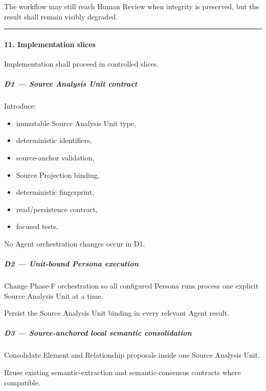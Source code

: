 The workflow may still reach Human Review when integrity is preserved, but the result shall remain visibly degraded.

\begin{center}\rule{0.5\linewidth}{0.5pt}\end{center}

\hypertarget{11-implementation-slices}{%
\paragraph{11. Implementation slices}\label{11-implementation-slices}}

Implementation shall proceed in controlled slices.

\hypertarget{d1--source-analysis-unit-contract}{%
\subparagraph{D1 --- Source Analysis Unit contract}\label{d1--source-analysis-unit-contract}}

Introduce:

\begin{itemize}
\tightlist
\item
  immutable Source Analysis Unit type,
\item
  deterministic identifiers,
\item
  source-anchor validation,
\item
  Source Projection binding,
\item
  deterministic fingerprint,
\item
  read/persistence contract,
\item
  focused tests.
\end{itemize}

No Agent orchestration changes occur in D1.

\hypertarget{d2--unit-bound-persona-execution}{%
\subparagraph{D2 --- Unit-bound Persona execution}\label{d2--unit-bound-persona-execution}}

Change Phase-F orchestration so all configured Persona runs process one explicit Source Analysis Unit at a time.

Persist the Source Analysis Unit binding in every relevant Agent result.

\hypertarget{d3--source-anchored-local-semantic-consolidation}{%
\subparagraph{D3 --- Source-anchored local semantic consolidation}\label{d3--source-anchored-local-semantic-consolidation}}

Consolidate Element and Relationship proposals inside one Source Analysis Unit.

Reuse existing semantic-extraction and semantic-consensus contracts where compatible.

